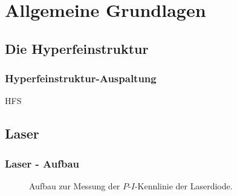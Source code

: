 
\section{Allgemeine Grundlagen}

\subsection{Die Hyperfeinstruktur}



\begin{frame}
\frametitle{Hyperfeinstruktur-Auspaltung}
  HFS
  

  \begin{figure}
    \centering
    \def\svgwidth{0.45\textwidth}
    
    \label{img:termschema}
\end{figure}
\end{frame}





\subsection{Laser}



\begin{frame}
\frametitle{Laser - Aufbau}

\begin{figure}
    \centering
    \def\svgwidth{\textwidth}
    
    \caption{Aufbau zur Messung der $P$-$I$-Kennlinie der Laserdiode.}
\end{figure}

\end{frame}






